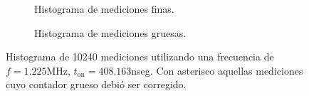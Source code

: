 \begin{figure}[H]
     \centering
     \begin{subfigure}[t]{0.45\textwidth} %
           \centering
           \caption{Histograma de mediciones finas.}
           \label{fig: histograma_66}
     \end{subfigure}%
     \hspace{10pt}%
     \begin{subfigure}[t]{0.4\textwidth} %
           \centering
           \caption{Histograma de mediciones gruesas.}
     \end{subfigure}
     \caption{Histograma de 10240 mediciones utilizando una frecuencia de $f=1.225$MHz, $t_{\text{on}}=408.163 $nseg. 
     Con asterisco aquellas mediciones cuyo contador grueso debió ser corregido.}
\end{figure}

